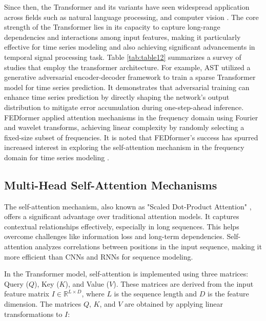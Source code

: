 \documentclass[preprint,12pt]{elsarticle}
\begin{document}
Since then, the Transformer and its variants have seen widespread application across fields such as natural language processing, and computer vision \cite{lin2022survey}. The core strength of the Transformer lies in its capacity to capture long-range dependencies and interactions among input features, making it particularly effective for time series modeling and also achieving significant advancements in temporal signal processing task. Table \ref{tab:table12} summarizes a survey of studies that employ the transformer architecture. For example, AST \cite{wu2020adversarial} utilized a generative adversarial encoder-decoder framework to train a sparse Transformer model for time series prediction. It demonstrates that adversarial training can enhance time series prediction by directly shaping the network's output distribution to mitigate error accumulation during one-step-ahead inference. FEDformer \cite{zhou2022fedformer} applied attention mechanisms in the frequency domain using Fourier and wavelet transforms, achieving linear complexity by randomly selecting a fixed-size subset of frequencies. It is noted that FEDformer's success has spurred increased interest in exploring the self-attention mechanism in the frequency domain for time series modeling \cite{wen2022transformers}.

\subsection{Multi-Head Self-Attention Mechanisms}

The self-attention mechanism, also known as "Scaled Dot-Product Attention" \cite{xu2023multimodal}, offers a significant advantage over traditional attention models. It captures contextual relationships effectively, especially in long sequences. This helps overcome challenges like information loss and long-term dependencies. Self-attention analyzes correlations between positions in the input sequence, making it more efficient than CNNs and RNNs for sequence modeling.

In the Transformer model, self-attention is implemented using three matrices: Query ($Q$), Key ($K$), and Value ($V$). These matrices are derived from the input feature matrix $I \in \mathbb{R}^{L \times D}$, where $L$ is the sequence length and $D$ is the feature dimension. The matrices $Q$, $K$, and $V$ are obtained by applying linear transformations to $I$:
\end{document}
